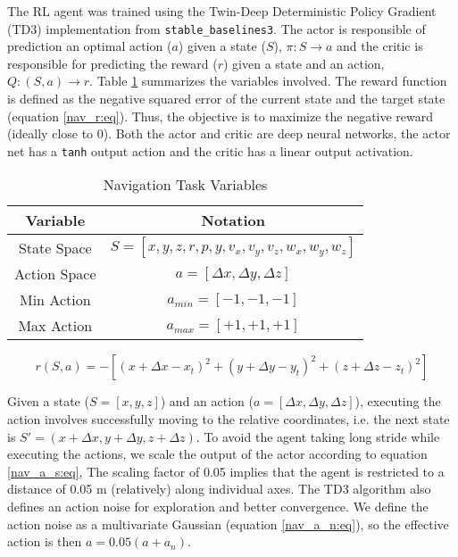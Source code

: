 \documentclass[../templateLTHtwocol.tex]{subfiles}
\begin{document}
The RL agent was trained using the Twin-Deep Deterministic Policy Gradient (TD3) implementation from \verb|stable_baselines3|. The actor is responsible of prediction an optimal action ($a$) given a state ($S$), $\pi : S \to a$ and the critic is responsible for predicting the reward ($r$) given a state and an action, $Q : (S, a) \to r$. Table \ref{nav_rl:table} summarizes the variables involved. The reward function is defined as the negative squared error of the current state and the target state (equation \ref{nav_r:eq}). Thus, the objective is to maximize the negative reward (ideally close to 0). Both the actor and critic are deep neural networks, the actor net has a \verb|tanh| output action and the critic has a linear output activation.

\begin{table}[h]
\caption{Navigation Task Variables}
	\label{nav_rl:table}
	\centering
	\begin{adjustbox}{max width=0.45\textwidth}
	\begin{tabular}{|c|c|}
		\hline
		\textbf{Variable} & \textbf{Notation}\\
		\hline \hline
		State Space & $S = [x, y, z, r, p, y, v_x, v_y, v_z, w_x, w_y, w_z]$ \\
		Action Space & $a = [\Delta x, \Delta y, \Delta z] $\\
		Min Action & $a_{min} = [-1, -1, -1] $ \\
		Max Action & $a_{max} = [+1, +1, +1] $ \\
		\hline
	\end{tabular}
	\end{adjustbox}
\end{table}


\begin{equation}
	\label{nav_r:eq}
	r(S, a) = - [(x + \Delta x - x_t)^2 + (y + \Delta y - y_t)^2 + (z + \Delta z - z_t)^2]
\end{equation}

Given a state ($S = [x, y, z]$) and an action ($a = [\Delta x, \Delta y, \Delta z]$), executing the action involves successfully moving to the relative coordinates, i.e. the next state is $S' = (x + \Delta x, y + \Delta y, z + \Delta z)$. To avoid the agent taking long stride while executing the actions, we scale the output of the actor according to equation \ref{nav_a_s:eq}, The scaling factor of 0.05 implies that the agent is restricted to a distance of 0.05 m (relatively) along individual axes. The TD3 algorithm also defines an action noise for exploration and better convergence. We define the action noise as a multivariate Gaussian (equation \ref{nav_a_n:eq}), so the effective action is then $a = 0.05 (a + a_n)$.
\end{document}
